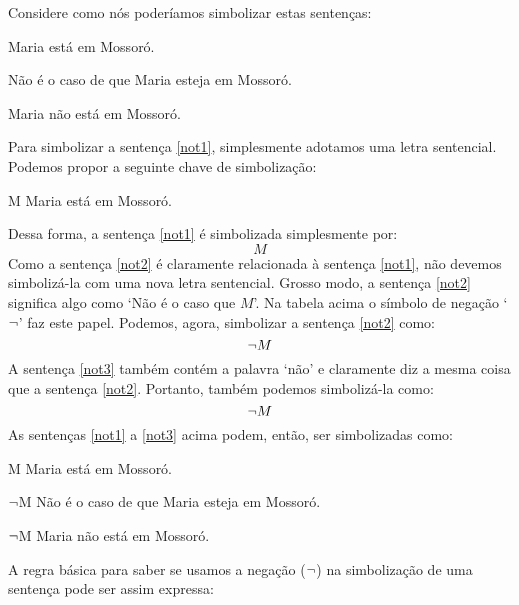 Considere como nós poderíamos simbolizar estas sentenças:
	\begin{earg}
	\item[\ex{not1}] Maria está em Mossoró.
	\item[\ex{not2}] Não é o caso de que Maria esteja em Mossoró.
	\item[\ex{not3}] Maria não está em Mossoró.
	\end{earg}
Para simbolizar a sentença \ref{not1}, simplesmente adotamos uma letra sentencial.
Podemos propor a seguinte chave de simbolização:
	\begin{ekey}
		\item[M] Maria está em Mossoró.
	\end{ekey}
Dessa forma, a sentença \ref{not1} é simbolizada simplesmente por:
$$M$$
Como a sentença \ref{not2} é claramente relacionada à sentença \ref{not1}, não devemos simbolizá-la com uma nova letra sentencial.
Grosso modo, a sentença \ref{not2} significa algo como `Não é o caso que $M$'.
Na tabela acima o símbolo de negação `$\neg$' faz este papel.
Podemos, agora, simbolizar a sentença \ref{not2} como:
$$\neg M$$
A sentença \ref{not3} também contém a palavra `não' e claramente diz a mesma coisa que a sentença \ref{not2}.
Portanto, também podemos simbolizá-la como:
$$\neg M$$
As sentenças \ref{not1} a \ref{not3} acima podem, então, ser simbolizadas como:
	\begin{ekey}
		\item[M] Maria está em Mossoró.
		\item[$\neg$M] Não é o caso de que Maria esteja em Mossoró.
		\item[$\neg$M] Maria não está em Mossoró.
	\end{ekey}
A regra básica para saber se usamos a negação ($\neg$) na simbolização de uma sentença pode ser assim expressa:

